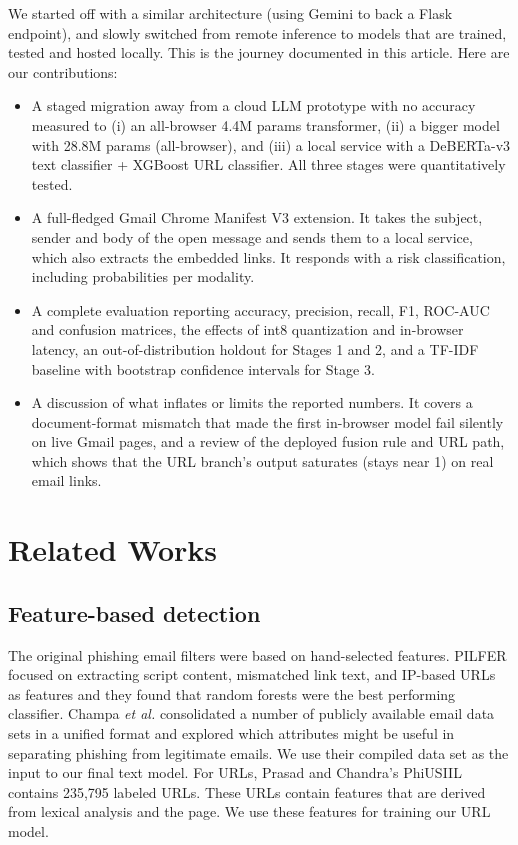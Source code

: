 \documentclass[conference]{IEEEtran}
\begin{document}
We started off with a similar architecture (using Gemini to back a Flask endpoint), and slowly switched from remote inference to models that are trained, tested and hosted locally. This is the journey documented in this article. Here are our contributions:
\begin{itemize}
\item A staged migration away from a cloud LLM prototype with no accuracy measured to (i) an all-browser 4.4M params transformer, (ii) a bigger model with 28.8M params (all-browser), and (iii) a local service with a DeBERTa-v3 text classifier + XGBoost URL classifier. All three stages were quantitatively tested.\item A full-fledged Gmail Chrome Manifest V3 extension. It takes the subject, sender and body of the open message and sends them to a local service, which also extracts the embedded links. It responds with a risk classification, including probabilities per modality.\item A complete evaluation reporting accuracy, precision, recall, F1, ROC-AUC and confusion matrices, the effects of int8 quantization and in-browser latency, an out-of-distribution holdout for Stages 1 and 2, and a TF-IDF baseline with bootstrap confidence intervals for Stage 3.\item A discussion of what inflates or limits the reported numbers. It covers a document-format mismatch that made the first in-browser model fail silently on live Gmail pages, and a review of the deployed fusion rule and URL path, which shows that the URL branch's output saturates (stays near 1) on real email links.
\end{itemize}

\section{Related Works}
\subsection{Feature-based detection}
The original phishing email filters were based on hand-selected features. PILFER \cite{fette2007pilfer} focused on extracting script content, mismatched link text, and IP-based URLs as features and they found that random forests were the best performing classifier. Champa \emph{et al.} \cite{champa2024curated} consolidated a number of publicly available email data sets in a unified format and explored which attributes might be useful in separating phishing from legitimate emails. We use their compiled data set as the input to our final text model. For URLs, Prasad and Chandra's PhiUSIIL \cite{prasad2024phiusiil} contains 235,795 labeled URLs. These URLs contain features that are derived from lexical analysis and the page. We use these features for training our URL model.
\end{document}
